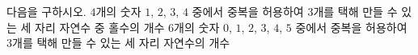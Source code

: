 다음을 구하시오.
 $4$개의 숫자 $1$, $2$, $3$, $4$ 중에서 중복을 허용하여 $3$개를 택해 만들 수 있는 세 자리 자연수 중 홀수의 개수
 $6$개의 숫자 $0$, $1$, $2$, $3$, $4$, $5$ 중에서 중복을 허용하여 $3$개를 택해 만들 수 있는 세 자리 자연수의 개수
